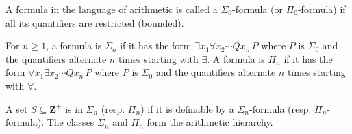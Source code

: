 A formula in the language of arithmetic is called a $\Sigma_0$-formula (or $\Pi_0$-formula) if all its quantifiers are restricted (bounded).

For $n \geq 1$, a formula is $\Sigma_n$ if it has the form $\exists x_1 \forall x_2 \cdots Q x_n \, P$ where $P$ is $\Sigma_0$ and the quantifiers alternate $n$ times starting with $\exists$. A formula is $\Pi_n$ if it has the form $\forall x_1 \exists x_2 \cdots Q x_n \, P$ where $P$ is $\Sigma_0$ and the quantifiers alternate $n$ times starting with $\forall$.

A set $S \subseteq \mathbf{Z}^+$ is in $\Sigma_n$ (resp. $\Pi_n$) if it is definable by a $\Sigma_n$-formula (resp. $\Pi_n$-formula). The classes $\Sigma_n$ and $\Pi_n$ form the arithmetic hierarchy.
